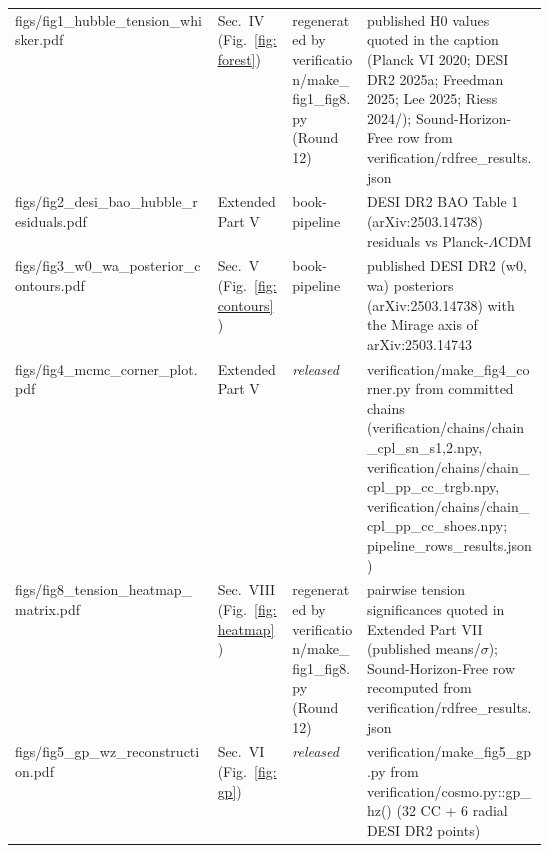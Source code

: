 \documentclass[aps,prd,preprint,superscriptaddress,nofootinbib]{revtex4-2}
\begin{document}
\begin{table}[h]
\begin{ruledtabular}
{\begin{tabular}{lp{0.14\linewidth}p{0.14\linewidth}p{0.34\linewidth}}
figs/\allowbreak fig1\_\allowbreak hubble\_\allowbreak tension\_\allowbreak whisker.pdf & Sec.~IV (Fig.~\ref{fig:forest}) & regenerated by verification/\allowbreak make\_\allowbreak fig1\_\allowbreak fig8.py (Round 12) & published H0 values quoted in the caption (Planck VI 2020; DESI DR2 2025a; Freedman 2025; Lee 2025; Riess 2024/\allowbreak2022); Sound-Horizon-Free row from verification/\allowbreak rdfree\_\allowbreak results.json \\
figs/\allowbreak fig2\_\allowbreak desi\_\allowbreak bao\_\allowbreak hubble\_\allowbreak residuals.pdf & Extended Part V & book-pipeline & DESI DR2 BAO Table 1 (arXiv:2503.14738) residuals vs Planck-$\Lambda$CDM \\
figs/\allowbreak fig3\_\allowbreak w0\_\allowbreak wa\_\allowbreak posterior\_\allowbreak contours.pdf & Sec.~V (Fig.~\ref{fig:contours}) & book-pipeline & published DESI DR2 (w0, wa) posteriors (arXiv:2503.14738) with the Mirage axis of arXiv:2503.14743 \\
figs/\allowbreak fig4\_\allowbreak mcmc\_\allowbreak corner\_\allowbreak plot.pdf & Extended Part V & \emph{released} & verification/\allowbreak make\_\allowbreak fig4\_\allowbreak corner.py from committed chains (verification/\allowbreak chains/\allowbreak chain\_\allowbreak cpl\_\allowbreak sn\_\allowbreak s{1,2}.npy, verification/\allowbreak chains/\allowbreak chain\_\allowbreak cpl\_\allowbreak pp\_\allowbreak cc\_\allowbreak trgb.npy, verification/\allowbreak chains/\allowbreak chain\_\allowbreak cpl\_\allowbreak pp\_\allowbreak cc\_\allowbreak shoes.npy; pipeline\_\allowbreak rows\_\allowbreak results.json) \\
figs/\allowbreak fig8\_\allowbreak tension\_\allowbreak heatmap\_\allowbreak matrix.pdf & Sec.~VIII (Fig.~\ref{fig:heatmap}) & regenerated by verification/\allowbreak make\_\allowbreak fig1\_\allowbreak fig8.py (Round 12) & pairwise tension significances quoted in Extended Part VII (published means/\allowbreak$\sigma$); Sound-Horizon-Free row recomputed from verification/\allowbreak rdfree\_\allowbreak results.json \\
figs/\allowbreak fig5\_\allowbreak gp\_\allowbreak wz\_\allowbreak reconstruction.pdf & Sec.~VI (Fig.~\ref{fig:gp}) & \emph{released} & verification/\allowbreak make\_\allowbreak fig5\_\allowbreak gp.py from verification/\allowbreak cosmo.py::gp\_\allowbreak hz() (32 CC + 6 radial DESI DR2 points) \\

\end{tabular}}
\end{ruledtabular}
\end{table}
\end{document}
